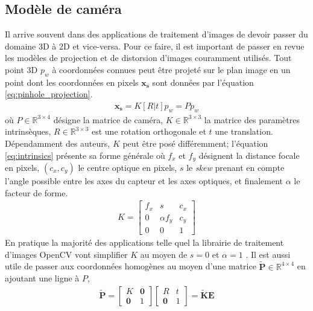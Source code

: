 \subsection{Modèle de caméra}
\label{subsec:modele_camera}
Il arrive souvent dans des applications de traitement d'images de devoir passer du domaine 3D à 2D et vice-versa. Pour ce faire, il est important de passer en revue les modèles de projection et de distorsion d'images couramment utilisés. Tout point 3D $p_w$ à coordonnées connues peut être projeté sur le plan image en un point dont les coordonnées en pixels $\boldsymbol{x_s}$ sont données par l'équation \ref{eq:pinhole_projection}.
\begin{align}
\boldsymbol{x_s} = K[R|t]p_w = P p_w
\label{eq:pinhole_projection}
\end{align}
où $P \in \mathbb{R}^{3\times 4}$ désigne la matrice de caméra, $K \in \mathbb{R}^{3\times3}$ la matrice des paramètres intrinsèques, $R\in \mathbb{R}^{3\times3}$ est une rotation orthogonale et $t$ une translation. Dépendamment des auteurs, $K$ peut être posé différemment; l'équation \ref{eq:intrinsics} présente sa forme générale où $f_x$ et $f_y$ désignent la distance focale en pixels, $(c_x, c_y)$ le centre optique en pixels, $s$ le \textit{skew} prenant en compte l'angle possible entre les axes du capteur et les axes optiques, et finalement $\alpha$ le facteur de forme.
\begin{align}
  K = \begin{bmatrix}
  f_x & s & c_x \\
  0   & \alpha f_y & c_y \\
  0  &  0  & 1
\end{bmatrix}
\label{eq:intrinsics}
\end{align}
En pratique la majorité des applications telle quel la librairie de traitement d'images OpenCV vont simplifier $K$ au moyen de $s = 0$ et $\alpha = 1$ \citep{itseez2015}. Il est aussi utile de passer aux coordonnées homogènes au moyen d'une matrice $\boldsymbol{\tilde{P}} \in \mathbb{R}^{4\times4}$ en ajoutant une ligne à $P$,
\begin{align}
  \boldsymbol{\tilde{P}} = \begin{bmatrix}K & \boldsymbol{0} \\ \boldsymbol{0} & 1\end{bmatrix}
  \begin{bmatrix}R & t \\ \boldsymbol{0} & 1\end{bmatrix} = \boldsymbol{\tilde{K}} \boldsymbol{E}
    \label{eq:homogeneous_projection}
\end{align}
